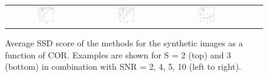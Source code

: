 \begin{figure}
\begin{tabular}{ccccc}
		\includegraphics[align=c,width=0.238\textwidth]{fig9f} &
		\includegraphics[align=c,width=0.238\textwidth]{fig9g} &
		\includegraphics[align=c,width=0.238\textwidth]{fig9h}
	\end{tabular}
	\caption{Average SSD score of the methods for the synthetic images as a function of COR. Examples are shown for S = 2 (top) and 3 (bottom) in combination with SNR = 2, 4, 5, 10 (left to right).}
	\label{fig9}
\end{figure}

